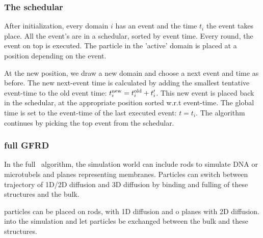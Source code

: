 \subsubsection{The schedular}
After initialization, every domain $i$ has an event and the time $t_i$ the event takes place. All the event's are in a schedular, sorted by event time. Every round, the event on top is executed. The particle in the 'active' domain is placed at a position depending on the event. 


At the new position, we draw a new domain and choose a next event and time as before. The new next-event time is calculated by adding the smallest tentative event-time to the old event time: $t^{\rm new}_i =  t^{\rm old}_i + t'_{i}$. This new event is placed back in the schedular, at the appropriate position sorted w.r.t event-time. The global time is set to the event-time of the last executed event: $t=t_i$. The algorithm continues by picking the top event from the schedular.


\subsubsection{full GFRD}
In the full \GFRD\ algorithm, the simulation world can include rods to simulate DNA or microtubels and planes representing membranes. Particles can switch between trajectory of 1D/2D diffusion and 3D diffusion by binding and fulling of these structures and the bulk. 


particles can be placed on rods, with 1D diffusion and o planes with 2D diffusion.    into the simulation and let particles be exchanged between the bulk and these structures.










